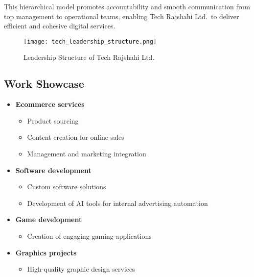 \documentclass[12pt,a4paper]{article}
\begin{document}
This hierarchical model promotes accountability and smooth communication from top management to operational teams, enabling Tech Rajshahi Ltd.\ to deliver efficient and cohesive digital services.

\begin{figure}[H]
    \centering
    \texttt{[image: tech\_leadership\_structure.png]}
    \caption{Leadership Structure of Tech Rajshahi Ltd.}
    \label{fig:leadership_structure}
\end{figure}

\subsection{Work Showcase}

\begin{itemize}
    \item \textbf{Ecommerce services}
    \begin{itemize}
        \item Product sourcing
        \item Content creation for online sales
        \item Management and marketing integration
    \end{itemize}

    \item \textbf{Software development}
    \begin{itemize}
        \item Custom software solutions
        \item Development of AI tools for internal advertising automation
    \end{itemize}

    \item \textbf{Game development}
    \begin{itemize}
        \item Creation of engaging gaming applications
    \end{itemize}

    \item \textbf{Graphics projects}
    \begin{itemize}
        \item High-quality graphic design services
    \end{itemize}
\end{itemize}
\end{document}
